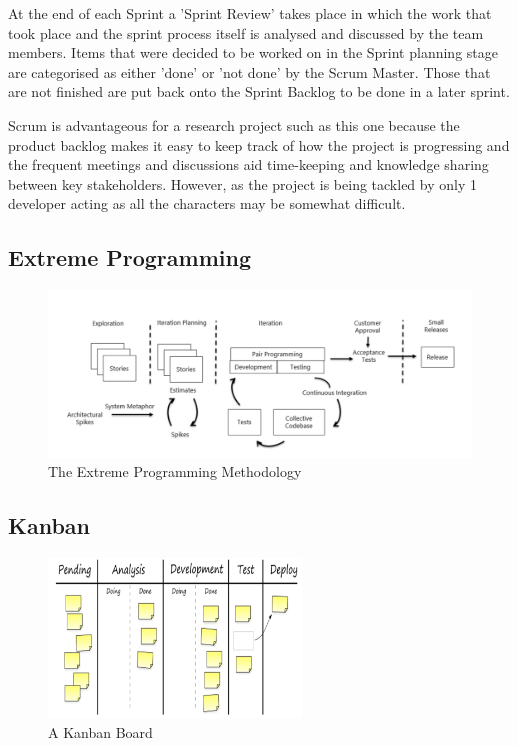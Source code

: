 \documentclass[11pt]{book}
\begin{document}
At the end of each Sprint a 'Sprint Review' takes place in which the work that took place and the sprint process itself is analysed and discussed by the team members. Items that were decided to be worked on in the Sprint planning stage are categorised as either 'done' or 'not done' by the Scrum Master. Those that are not finished are put back onto the Sprint Backlog to be done in a later sprint.

Scrum is advantageous for a research project such as this one because the product backlog makes it easy to keep track of how the project is progressing and the frequent meetings and discussions aid time-keeping and knowledge sharing between key stakeholders. However, as the project is being tackled by only 1 developer acting as all the characters may be somewhat difficult. 

\subsection{Extreme Programming}

\begin{figure}[H]
	\centering
	\includegraphics[width=\textwidth]{images/xp}
	\caption{The Extreme Programming Methodology \cite{xpdiagram}}
	\label{fig:xp}
\end{figure}

\subsection{Kanban}
\begin{figure}[H]
	\centering
	\includegraphics[width=0.6\textwidth]{images/kanban}
	\caption{A Kanban Board \cite{kanbandiagram}}
	\label{fig:kanban}
\end{figure}
\end{document}
